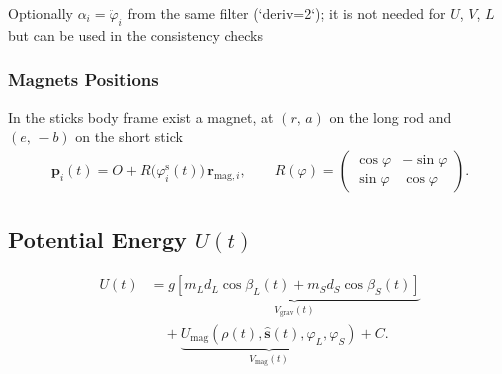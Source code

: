 \documentclass[letterpaper, 10pt, conference]{IEEEtran}
\begin{document}
                   Optionally $\alpha_i = \ddot\varphi_i$ from the same filter (`deriv=2`); it is
                   not needed for $U$, $V$, $L$ but can be used in the consistency checks
                
                \subsubsection{\textbf{Magnets Positions}}
                    In the sticks body frame exist a magnet, at $(r,\,a)$ on the long rod and $(e,\, -b)$ on the short stick
                    \begin{align}
                      \mathbf p_i(t) = O + R\!\big(\varphi_i^{\text{s}}(t)\big)\,\mathbf r_{\mathrm{mag},i},
                      \qquad
                      R(\varphi)=\begin{pmatrix}\cos\varphi & -\sin\varphi\\ \sin\varphi & \cos\varphi\end{pmatrix}.
                    \end{align}
                    
      
                 
            \subsection{\textbf{Potential Energy $U(t)$}}
            
            \begin{align}
                U(t)
                &= \underbrace{g\left[
                    m_L d_L \cos\beta_L(t)
                    + m_S d_S \cos\beta_S(t)
                \right]}_{V_{\text{grav}}(t)} \nonumber \\
                &\quad + \underbrace{
                    U_{\text{mag}}\left(
                        \rho(t), \hat{\mathbf{s}}(t),
                        \varphi_L, \varphi_S
                    \right)
                }_{V_{\text{mag}}(t)}
                + C.
            \end{align}
            
\end{document}
